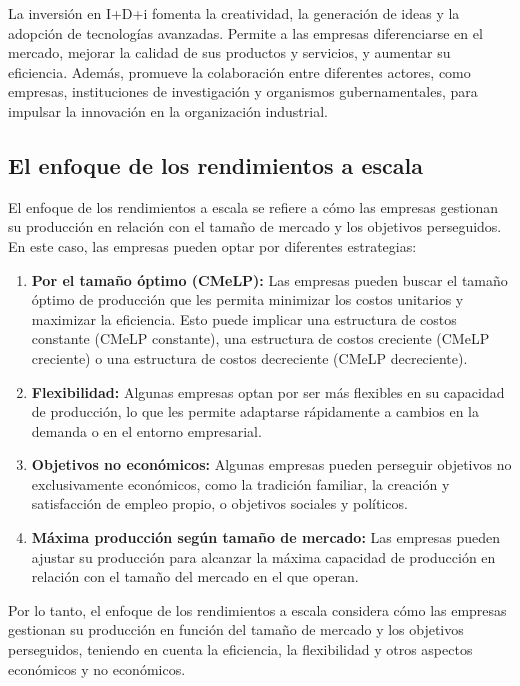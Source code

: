\documentclass[
  doc,
  floatsintext,
  longtable,
  a4paper,
  nolmodern,
  notxfonts,
  notimes,
  colorlinks=true,linkcolor=blue,citecolor=blue,urlcolor=blue]{apa7}
\begin{document}
La inversión en I+D+i fomenta la creatividad, la generación de ideas y
la adopción de tecnologías avanzadas. Permite a las empresas
diferenciarse en el mercado, mejorar la calidad de sus productos y
servicios, y aumentar su eficiencia. Además, promueve la colaboración
entre diferentes actores, como empresas, instituciones de investigación
y organismos gubernamentales, para impulsar la innovación en la
organización industrial.

\subsection{El enfoque de los rendimientos a
escala}\label{el-enfoque-de-los-rendimientos-a-escala}

El enfoque de los rendimientos a escala se refiere a cómo las empresas
gestionan su producción en relación con el tamaño de mercado y los
objetivos perseguidos. En este caso, las empresas pueden optar por
diferentes estrategias:

\begin{enumerate}
\def\labelenumi{\Alph{enumi})}
\item
  \textbf{Por el tamaño óptimo (CMeLP):} Las empresas pueden buscar el
  tamaño óptimo de producción que les permita minimizar los costos
  unitarios y maximizar la eficiencia. Esto puede implicar una
  estructura de costos constante (CMeLP constante), una estructura de
  costos creciente (CMeLP creciente) o una estructura de costos
  decreciente (CMeLP decreciente).
\item
  \textbf{Flexibilidad:} Algunas empresas optan por ser más flexibles en
  su capacidad de producción, lo que les permite adaptarse rápidamente a
  cambios en la demanda o en el entorno empresarial.
\item
  \textbf{Objetivos no económicos:} Algunas empresas pueden perseguir
  objetivos no exclusivamente económicos, como la tradición familiar, la
  creación y satisfacción de empleo propio, o objetivos sociales y
  políticos.
\item
  \textbf{Máxima producción según tamaño de mercado:} Las empresas
  pueden ajustar su producción para alcanzar la máxima capacidad de
  producción en relación con el tamaño del mercado en el que operan.
\end{enumerate}

Por lo tanto, el enfoque de los rendimientos a escala considera cómo las
empresas gestionan su producción en función del tamaño de mercado y los
objetivos perseguidos, teniendo en cuenta la eficiencia, la flexibilidad
y otros aspectos económicos y no económicos.
\end{document}
